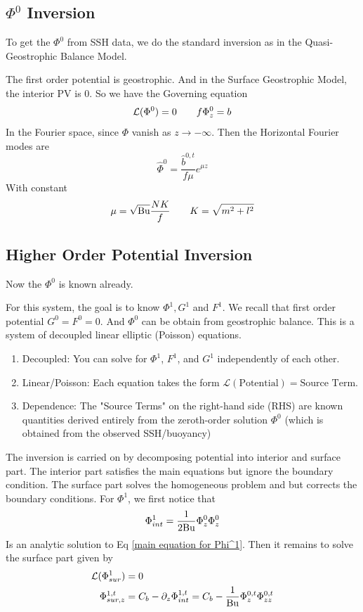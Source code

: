 \documentclass[../SQG_notes.tex]{subfiles}
\begin{document}
\subsection{\texorpdfstring{$\Phi^0$}{Phi} Inversion}

To get the $\Phi^0$ from SSH data, we do the standard inversion as in the Quasi-Geostrophic Balance Model.  \par

The first order potential is geostrophic. And in the Surface Geostrophic Model, the interior PV is 0. So we have the Governing equation 
\[ \mathcal{L}(\Phi^0) = 0 \qquad f\Phi_z^0 = b\]
In the Fourier space, since $\Phi$ vanish as $z \to -\infty$. Then the Horizontal Fourier modes are 
\[ \widehat{\Phi}^0 = \frac{\hat{b}^{0,t}}{f \mu} e^{\mu z}\]
With constant
\[ \mu = \sqrt{\text{Bu}} \frac{NK}{f} \qquad K = \sqrt{m^2 + l^2}\]

\subsection{Higher Order Potential Inversion}
Now the $\Phi^0$ is known already. 
\begin{explanation}
    For this system, the goal is to know $\Phi^1, G^1$ and $F^1$. We recall that first order potential $G^0 = F^0 = 0$. And $\Phi^0$ can be obtain from geostrophic balance. This is a system of decoupled linear elliptic (Poisson) equations. \begin{enumerate}
        \item  Decoupled: You can solve for $\Phi^1$, $F^1$, and $G^1$ independently of each other.
        \item Linear/Poisson: Each equation takes the form $\mathcal{L}(\text{Potential}) = \text{Source Term}$.
        \item Dependence: The "Source Terms" on the right-hand side (RHS) are known quantities derived entirely from the zeroth-order solution $\Phi^0$ (which is obtained from the observed SSH/buoyancy)
    \end{enumerate} 
\end{explanation}
The inversion is carried on by decomposing potential into interior and surface part. The interior part satisfies the main equations but ignore the boundary condition. The surface part solves the homogeneous problem and but corrects the boundary conditions. For $\Phi^1$, we first notice that 
\begin{equation}
    \Phi_{int}^1 = \frac{1}{2\text{Bu}}\Phi_z^0\Phi_z^0 \label{Analytic solution for phi_int}
\end{equation}
Is an analytic solution to Eq \ref{main equation for Phi^1}. Then it remains to solve the surface part given by 
\begin{align}
    \mathcal{L}(\Phi_{sur}^1) &= 0 \\
    \Phi_{sur,z}^{1,t} &= C_b - \partial_z \Phi_{int}^{1,t} = C_b - \frac{1}{\text{Bu}}\Phi_z^{0,t}\Phi_{zz}^{0,t}
\end{align}
\end{document}
